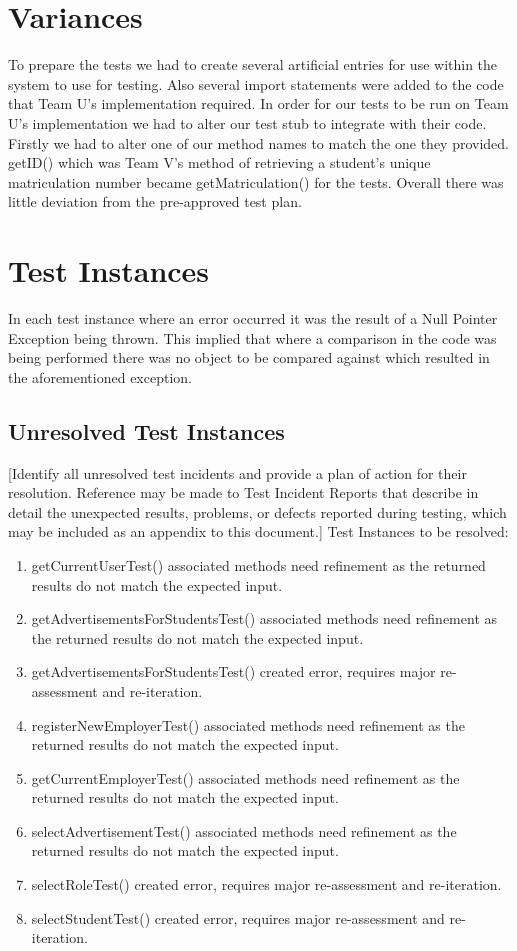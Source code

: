 \documentclass{l3deliverable}
\begin{document}
\section{Variances}
To prepare the tests we had to create several artificial entries for use within the system to use for testing. Also several import statements were added to the code that Team U's implementation required.
In order for our tests to be run on Team U's implementation we had to alter our test stub to integrate with their code. Firstly we had to alter one of our method names to match the one they provided. getID() which was Team V's method of retrieving a student's unique matriculation number became getMatriculation() for the tests.  
Overall there was little deviation from the pre-approved test plan.

\section{Test Instances}
In each test instance where an error occurred it was the result of a Null Pointer Exception being thrown. This implied that where a comparison in the code was being performed there was no object to be compared against which resulted in the aforementioned exception. 

\subsection{Unresolved Test Instances}
[Identify all unresolved test incidents and provide a plan of action for their resolution.  Reference may be made to Test Incident Reports that describe in detail the unexpected results, problems, or defects reported during testing, which may be included as an appendix to this document.]
Test Instances to be resolved:

\begin{enumerate} 
\item getCurrentUserTest() associated methods need refinement as the returned results do not match the expected input.
\item getAdvertisementsForStudentsTest() associated methods need refinement as the returned results do not match the expected input.
\item getAdvertisementsForStudentsTest() created error, requires major re-assessment and re-iteration.
\item registerNewEmployerTest() associated methods need refinement as the returned results do not match the expected input.
\item getCurrentEmployerTest() associated methods need refinement as the returned results do not match the expected input.
\item selectAdvertisementTest() associated methods need refinement as the returned results do not match the expected input.
\item selectRoleTest() created error, requires major re-assessment and re-iteration.
\item selectStudentTest() created error, requires major re-assessment and re-iteration.
\end{enumerate}
\end{document}
